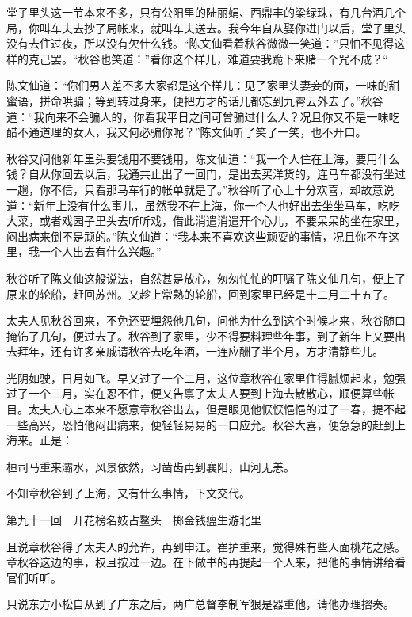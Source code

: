 \documentclass[12pt,UTF8]{ctexbook}
\begin{document}
{{{堂子里头这一节本来不多，只有公阳里的陆丽娟、西鼎丰的梁绿珠，有几台酒几个局，你叫车夫去抄了局帐来，就叫车夫送去。我今年自从娶你进门以后，堂子里头没有去住过夜，所以没有欠什么钱。“陈文仙看着秋谷微微一笑道：”只怕不见得这样的克己罢。“秋谷也笑道：”看你这个样儿，难道要我跪下来赌一个咒不成？“

陈文仙道：“你们男人差不多大家都是这个样儿：见了家里头妻妾的面，一味的甜蜜语，拼命哄骗；等到转过身来，便把方才的话儿都忘到九霄云外去了。”秋谷道：“我向来不会骗人的，你看我平日之间可曾骗过什么人？况且你又不是一味吃醋不通道理的女人，我又何必骗你呢？”陈文仙听了笑了一笑，也不开口。

秋谷又问他新年里头要钱用不要钱用，陈文仙道：“我一个人住在上海，要用什么钱？自从你回去以后，我通共止出了一回门，是出去买洋货的，连马车都没有坐过一趟，你不信，只看那马车行的帐单就是了。”秋谷听了心上十分欢喜，却故意说道：“新年上没有什么事儿，虽然我不在上海，你一个人也好出去坐坐马车，吃吃大菜，或者戏园子里头去听听戏，借此消遣消遣开个心儿，不要呆呆的坐在家里，闷出病来倒不是顽的。”陈文仙道：“我本来不喜欢这些顽耍的事情，况且你不在这里，我一个人出去有什么兴趣。”

秋谷听了陈文仙这般说法，自然甚是放心，匆匆忙忙的叮嘱了陈文仙几句，便上了原来的轮船，赶回苏州。又趁上常熟的轮船，回到家里已经是十二月二十五了。

太夫人见秋谷回来，不免还要埋怨他几句，问他为什么到这个时候才来，秋谷随口掩饰了几句，便过去了。秋谷到了家里，少不得要料理些年事，到了新年上又要出去拜年，还有许多亲戚请秋谷去吃年酒，一连应酬了半个月，方才清静些儿。

光阴如驶，日月如飞。早又过了一个二月，这位章秋谷在家里住得腻烦起来，勉强过了一个三月，实在忍不住，便又告禀了太夫人要到上海去散散心，顺便算些帐目。太夫人心上本来不愿意章秋谷出去，但是眼见他恹恹悒悒的过了一春，提不起一些高兴，恐怕他闷出病来，便轻轻易易的一口应允。秋谷大喜，便急急的赶到上海来。正是：

桓司马重来灞水，风景依然，习凿齿再到襄阳，山河无恙。

不知章秋谷到了上海，又有什么事情，下文交代。





第九十一回　开花榜名妓占鳌头　掷金钱瘟生游北里





且说章秋谷得了太夫人的允许，再到申江。崔护重来，觉得殊有些人面桃花之感。章秋谷这边的事，权且按过一边。在下做书的再提起一个人来，把他的事情讲给看官们听听。

只说东方小松自从到了广东之后，两广总督李制军狠是器重他，请他办理摺奏。

}}}
\end{document}
